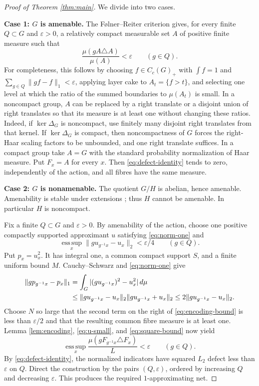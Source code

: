 \documentclass[11pt]{article}
\newcommand{\1}{\mathbf 1}
\newcommand{\esssup}{\operatorname*{ess\,sup}}
\begin{document}
\begin{proof}[Proof of Theorem \ref{thm:main}]
We divide into two cases.

\smallskip
\noindent\textbf{Case 1: $G$ is amenable.}
The F\o lner--Reiter criterion gives, for every finite $Q\subset G$ and
$\varepsilon>0$, a relatively compact measurable set $A$ of positive finite
measure such that
\[
 \frac{\mu(gA\triangle A)}{\mu(A)}<\varepsilon\qquad(g\in Q).
\]
For completeness, this follows by choosing
$f\in C_c(G)_+$ with $\int f=1$ and
$\sum_{g\in Q}\|gf-f\|_1<\varepsilon$, applying layer cake to
$A_t=\{f>t\}$, and selecting one level at which the ratio of the summed
boundaries to $\mu(A_t)$ is small.  In a noncompact group, $A$ can be replaced
by a right translate or a disjoint union of right translates so that its
measure is at least one without changing these ratios.  Indeed, if
$\ker\Delta_G$ is noncompact, use finitely many disjoint right translates from
that kernel.  If $\ker\Delta_G$ is compact, then noncompactness of $G$ forces
the right-Haar scaling factors to be unbounded, and one right translate
suffices.  In a compact group take $A=G$ with the standard probability
normalization of Haar measure.  Put $F_x=A$ for every $x$.  Then
\eqref{eq:defect-identity} tends to zero, independently of the action, and all
fibres have the same measure.

\smallskip
\noindent\textbf{Case 2: $G$ is nonamenable.}
The quotient $G/H$ is abelian, hence amenable.  Amenability is
stable under extensions \cite[Chapter 2]{Paterson}; thus $H$ cannot be
amenable.  In particular $H$ is noncompact.

Fix a finite $Q\subset G$ and $\varepsilon>0$.  By amenability of the action,
choose one positive compactly supported approximant $u$ satisfying
\eqref{eq:norm-one} and
\begin{equation}\label{eq:u-small}
 \esssup_x\|g u_{g^{-1}x}-u_x\|_2<\varepsilon/4
 \qquad(g\in Q).
\end{equation}
Put $p_x=u_x^2$.  It has integral one, a common compact support $S$, and a
finite uniform bound $M$.  Cauchy--Schwarz and \eqref{eq:norm-one} give
\begin{align}
 \|g p_{g^{-1}x}-p_x\|_1
 &=\int_G |(g u_{g^{-1}x})^2-u_x^2|\,d\mu\notag\\
 &\leq\|g u_{g^{-1}x}-u_x\|_2
       \|g u_{g^{-1}x}+u_x\|_2
 \leq2\|g u_{g^{-1}x}-u_x\|_2.\label{eq:square-bound}
\end{align}
Choose $N$ so large that the second term on the right of
\eqref{eq:encoding-bound} is less than $\varepsilon/2$ and that the resulting
common fibre measure is at least one.  Lemma \ref{lem:encoding},
\eqref{eq:u-small}, and \eqref{eq:square-bound} now yield
\[
 \esssup_x\frac{\mu(gF_{g^{-1}x}\triangle F_x)}{L}<\varepsilon
 \qquad(g\in Q).
\]
By \eqref{eq:defect-identity}, the normalized indicators have squared
$L_2$ defect less than $\varepsilon$ on $Q$.  Direct the construction by the
pairs $(Q,\varepsilon)$, ordered by increasing $Q$ and decreasing
$\varepsilon$.  This produces the required $1$-approximating net.
\end{proof}
\end{document}
